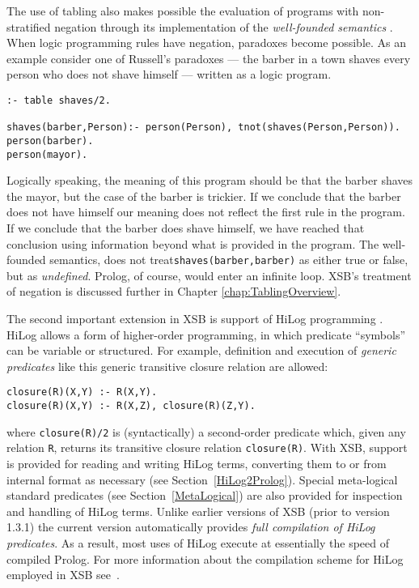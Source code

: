 \begin{example} \label{ex:Russell}
The use of tabling also makes possible the evaluation of programs with
non-stratified negation through its implementation of the {\em
well-founded semantics} \cite{VGRS91}.  When logic programming rules
have negation, paradoxes become possible.  As an example consider one
of Russell's paradoxes --- 
the barber in a town shaves every person who does not shave himself ---
written as a logic program.
\begin{center}
\begin{verbatim} 
:- table shaves/2.

shaves(barber,Person):- person(Person), tnot(shaves(Person,Person)).
person(barber).
person(mayor).
\end{verbatim} 
\end{center}
Logically speaking, the meaning of this program should be that the
barber shaves 
the mayor, but the case of the barber is trickier.  If we conclude
that the barber does not have himself our meaning does not reflect the 
first rule in the program.  If we conclude that the barber does shave
himself, we have reached that conclusion using information beyond what 
is provided in the program.  The well-founded semantics, does not
treat{\tt shaves(barber,barber)} as either true or false, but as {\em
undefined}. 
Prolog, of course, would enter an infinite loop.  XSB's treatment of
negation is discussed further in Chapter \ref{chap:TablingOverview}.
\end{example}

The second important extension in XSB is support of HiLog
programming \cite{ChKW93,SaWa95}.  HiLog allows a form of 
higher-order programming, in
which predicate ``symbols'' can be variable or structured.  For example,
definition and execution of {\em generic predicates} like this generic
transitive closure relation are allowed:
\begin{center}
\begin{minipage}{3.7in}
\begin{verbatim}
closure(R)(X,Y) :- R(X,Y).
closure(R)(X,Y) :- R(X,Z), closure(R)(Z,Y).
\end{verbatim}
\end{minipage}
\end{center}
where {\tt closure(R)/2} is (syntactically) a second-order predicate
which, given any relation {\tt R}, returns its transitive closure
relation {\tt closure(R)}.  With XSB, support is provided for reading and
writing HiLog terms, converting them to or from internal format as
necessary (see Section~\ref{HiLog2Prolog}).  Special meta-logical
standard predicates (see Section~\ref{MetaLogical}) are also provided
for inspection and handling of HiLog terms.  Unlike earlier versions
of XSB (prior to version 1.3.1) the current version automatically
provides {\em full compilation of HiLog predicates}.  As a result,
most uses of HiLog execute at essentially the speed of compiled
Prolog.  For more information about the compilation scheme for HiLog
employed in XSB see~\cite{SaWa95}.

